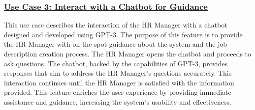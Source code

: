 \subsubsection{\underline{Use Case 3: Interact with a Chatbot for Guidance}}
This use case describes the interaction of the HR Manager with a chatbot designed and developed using GPT-3. The purpose of this feature is to provide the HR Manager with on-the-spot guidance about the system and the job description creation process. The HR Manager opens the chatbot and proceeds to ask questions. The chatbot, backed by the capabilities of GPT-3, provides responses that aim to address the HR Manager's questions accurately. This interaction continues until the HR Manager is satisfied with the information provided. This feature enriches the user experience by providing immediate assistance and guidance, increasing the system's usability and effectiveness.


